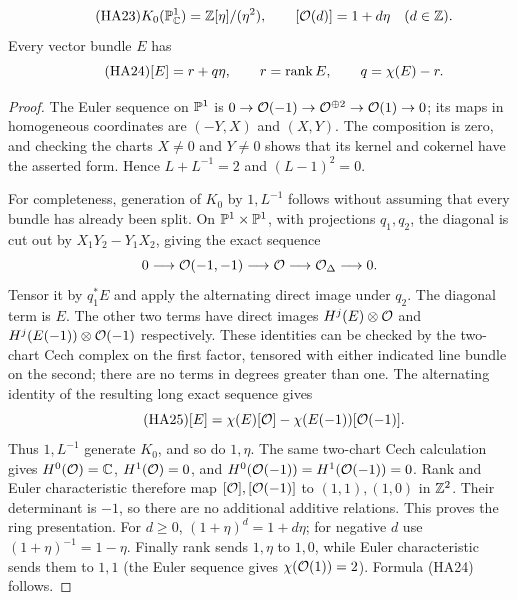 \begin{lemma}
\begin{equation}\tag{HA23}
 K_0(\mathbb P^1_\mathbb C)=\mathbb Z[\eta]/(\eta^2),\qquad
 [\mathcal O(d)]=1+d\eta\quad(d\in\mathbb Z).
\end{equation}
Every vector bundle $E$ has
\begin{equation}\tag{HA24}
 [E]=r+q\eta,\qquad r=\operatorname{rank} E,\qquad
 q=\chi(E)-r.
\end{equation}
\end{lemma}
\begin{proof}
The Euler sequence on $\mathbb P^1$ is
$0\to\mathcal O(-1)\to\mathcal O^{\oplus2}\to\mathcal O(1)\to0$;
its maps in homogeneous coordinates are $(-Y,X)$ and $(X,Y)$.
The composition is zero, and checking the charts $X\ne0$ and $Y\ne0$
shows that its kernel and cokernel have the asserted form. Hence
$L+L^{-1}=2$ and $(L-1)^2=0$.

For completeness, generation of $K_0$ by $1,L^{-1}$ follows without
assuming that every bundle has already been split. On
$\mathbb P^1\times\mathbb P^1$, with projections $q_1,q_2$, the diagonal is cut out
by $X_1Y_2-Y_1X_2$, giving the exact sequence
\[
 0\longrightarrow\mathcal O(-1,-1)\longrightarrow\mathcal O
   \longrightarrow\mathcal O_\Delta\longrightarrow0.
\]
Tensor it by $q_1^*E$ and apply the alternating direct image under $q_2$.
The diagonal term is $E$. The other two terms have direct images
$H^j(E)\otimes\mathcal O$ and $H^j(E(-1))\otimes\mathcal O(-1)$ respectively.
These identities can be checked by the two-chart Cech complex on the
first factor, tensored with either indicated line bundle on the second;
there are no terms in degrees greater than one. The alternating
identity of the resulting long exact sequence gives
\begin{equation}\tag{HA25}
 [E]=\chi(E)[\mathcal O]-\chi(E(-1))[\mathcal O(-1)].
\end{equation}
Thus $1,L^{-1}$ generate $K_0$, and so do $1,\eta$.
The same two-chart Cech calculation gives
$H^0(\mathcal O)=\mathbb C$, $H^1(\mathcal O)=0$, and
$H^0(\mathcal O(-1))=H^1(\mathcal O(-1))=0$.
Rank and Euler characteristic therefore map $[\mathcal O],[\mathcal O(-1)]$ to
$(1,1),(1,0)$ in $\mathbb Z^2$. Their determinant is $-1$, so there are
no additional additive relations. This proves the ring presentation.
For $d\ge0$, $(1+\eta)^d=1+d\eta$; for negative $d$ use
$(1+\eta)^{-1}=1-\eta$. Finally rank sends $1,\eta$ to $1,0$,
while Euler characteristic sends them to $1,1$ (the Euler sequence
gives $\chi(\mathcal O(1))=2$). Formula (HA24) follows.
\end{proof}

